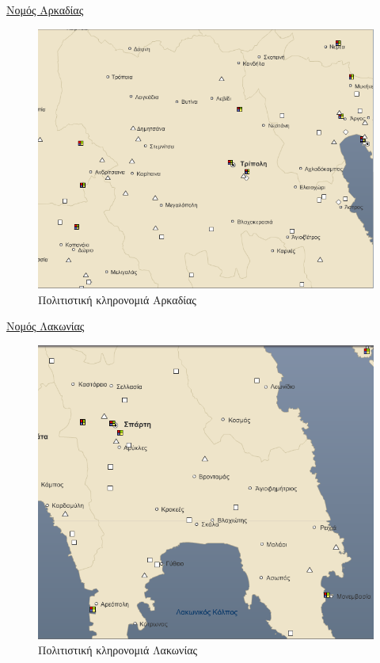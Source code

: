 \documentclass[12pt]{article}
\begin{document}
	\underline{Νομός Αρκαδίας}
	
	\begin{figure} [H]
		\begin{center}
			\includegraphics [scale = 0.60] {arkadia2.png}
			\caption{Πολιτιστική κληρονομιά Αρκαδίας}
		\end{center}
	\end{figure}

	\underline{Νομός Λακωνίας}
	
	\begin{figure} [H]
		\begin{center}
			\includegraphics [scale = 0.60] {lakonia2.png}
			\caption{Πολιτιστική κληρονομιά Λακωνίας}
		\end{center}
	\end{figure}
\end{document}
